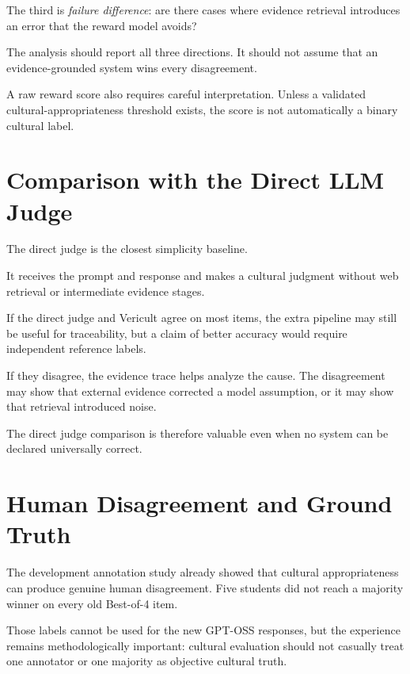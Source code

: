 The third is \emph{failure difference}: are there cases where evidence retrieval introduces an error that the reward model avoids?

The analysis should report all three directions. It should not assume that an evidence-grounded system wins every disagreement.

A raw reward score also requires careful interpretation. Unless a validated cultural-appropriateness threshold exists, the score is not automatically a binary cultural label.


\section{Comparison with the Direct LLM Judge}

The direct judge is the closest simplicity baseline.

It receives the prompt and response and makes a cultural judgment without web retrieval or intermediate evidence stages.

If the direct judge and Vericult agree on most items, the extra pipeline may still be useful for traceability, but a claim of better accuracy would require independent reference labels.

If they disagree, the evidence trace helps analyze the cause. The disagreement may show that external evidence corrected a model assumption, or it may show that retrieval introduced noise.

The direct judge comparison is therefore valuable even when no system can be declared universally correct.


\section{Human Disagreement and Ground Truth}

The development annotation study already showed that cultural appropriateness can produce genuine human disagreement. Five students did not reach a majority winner on every old Best-of-4 item.

Those labels cannot be used for the new GPT-OSS responses, but the experience remains methodologically important: cultural evaluation should not casually treat one annotator or one majority as objective cultural truth.

